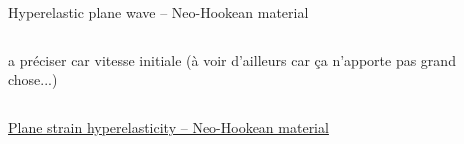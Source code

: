 \begin{frame}{Hyperelastic plane wave -- Neo-Hookean material}
  \begin{columns}
    \begin{column}{.5\linewidth}
      
      a préciser car vitesse initiale (à voir d'ailleurs car ça n'apporte pas grand chose...)
    \end{column}

    \begin{column}{.5\linewidth}
      
    \end{column}
  \end{columns}
\end{frame}


\begin{frame}{\href{section4/animation/hyperelasticity_velo/video.mp4}{Plane strain hyperelasticity -- Neo-Hookean material}}
  \begin{overprint}
    \vspace{1.cm}
    \begin{center}
      
    \end{center}

    \vspace{0.cm}
    \begin{center}
    \end{center}
  \end{overprint}
\end{frame}


